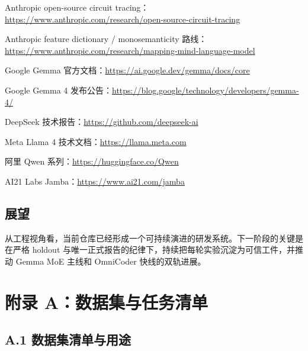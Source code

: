 \documentclass[11pt,a4paper]{article}
\begin{document}
  \par Anthropic open-source circuit tracing：\url{https://www.anthropic.com/research/open-source-circuit-tracing}
  \par Anthropic feature dictionary / monosemanticity 路线：\url{https://www.anthropic.com/research/mapping-mind-language-model}
  \par Google Gemma 官方文档：\url{https://ai.google.dev/gemma/docs/core}
  \par Google Gemma 4 发布公告：\url{https://blog.google/technology/developers/gemma-4/}
  \par DeepSeek 技术报告：\url{https://github.com/deepseek-ai}
  \par Meta Llama 4 技术文档：\url{https://llama.meta.com}
  \par 阿里 Qwen 系列：\url{https://huggingface.co/Qwen}
  \par AI21 Labs Jamba：\url{https://www.ai21.com/jamba}


\subsection{展望}

从工程视角看，当前仓库已经形成一个可持续演进的研发系统。下一阶段的关键是在严格 holdout 与唯一正式报告的纪律下，持续把每轮实验沉淀为可信工件，并推动 Gemma MoE 主线和 OmniCoder 快线的双轨进展。

\clearpage
\appendix

\section{附录 A：数据集与任务清单}

\subsection{A.1 数据集清单与用途}
\end{document}
